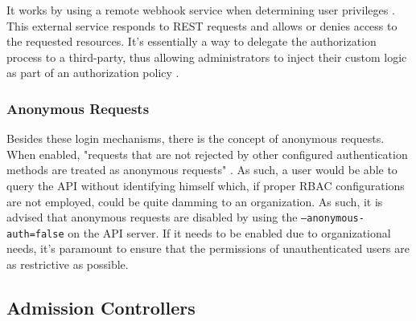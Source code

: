 \documentclass[a4paper,11pt,openright,BCOR=15mm]{scrbook}
\begin{document}
It works by using a remote webhook service when determining user privileges \cite{the_linux_foundation_webhook_2024}. This external service responds to REST requests and allows or denies access to the requested resources. It's essentially a way to delegate the authorization process to a third-party, thus allowing administrators to inject their custom logic as part of an authorization policy \cite{eknert_kubernetes_2022}.

\subsubsection{Anonymous Requests}

Besides these login mechanisms, there is the concept of anonymous requests. When enabled, "requests that are not rejected by other configured authentication methods are treated as anonymous requests" \cite{the_linux_foundation_authenticating_2024}. As such, a user would be able to query the API without identifying himself which, if proper RBAC configurations are not employed, could be quite damming to an organization. As such, it is advised that anonymous requests are disabled by using the \texttt{--anonymous-auth=false} on the API server. If it needs to be enabled due to organizational needs, it's paramount to ensure that the permissions of unauthenticated users are as restrictive as possible.

\subsection{Admission Controllers}

%
%
%
%
%
%
%
\end{document}
